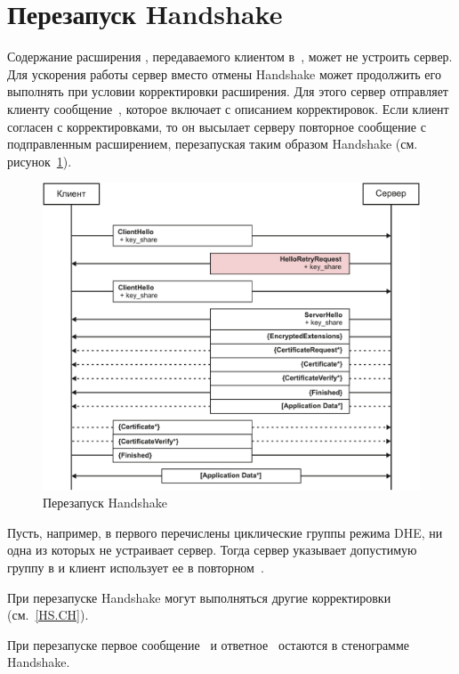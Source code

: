 \section{Перезапуск Handshake}\label{COMMON.Retry} 

Содержание расширения , передаваемого клиентом
в~, может не устроить сервер. Для ускорения работы
сервер вместо отмены Handshake может продолжить его выполнять при условии
корректировки расширения. Для этого сервер отправляет клиенту
сообщение~, которое включает
 с описанием корректировок.
%
Если клиент согласен с корректировками, то он высылает серверу повторное
сообщение  с подправленным расширением, перезапуская
таким образом Handshake (см. рисунок~\ref{Fig.COMMON.Retry}).

\begin{figure}[hbt]
\begin{center}
\includegraphics[width=15cm]{../figs/Retry}
\end{center}
\caption{Перезапуск Handshake}\label{Fig.COMMON.Retry}
\end{figure}

Пусть, например, в  первого
 перечислены циклические группы режима DHE, ни одна из
которых не устраивает сервер. Тогда сервер указывает допустимую группу в
 и клиент использует ее в
повторном~.

При перезапуске Handshake могут выполняться другие корректировки
 (см.~\ref{HS.CH}).

При перезапуске первое сообщение~ и
ответное~ остаются в стенограмме Handshake.
